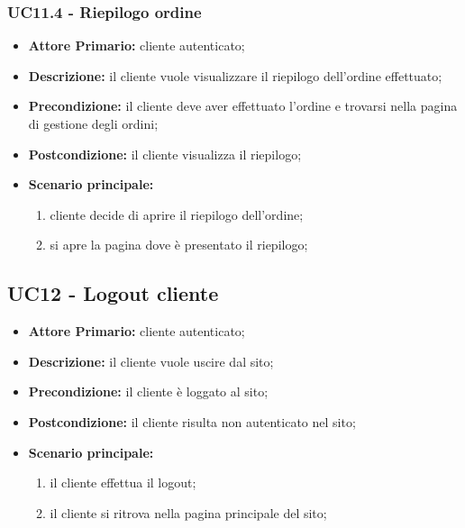 \subsubsection{UC11.4 - Riepilogo ordine}
\label{UC11.4}
\begin{itemize}
\item \textbf{Attore Primario:} cliente autenticato;
\item \textbf{Descrizione:} il cliente vuole visualizzare il riepilogo dell'ordine effettuato;
\item \textbf{Precondizione:} il cliente deve aver effettuato l'ordine e trovarsi nella pagina di gestione degli ordini;
\item \textbf{Postcondizione:} il cliente visualizza il riepilogo;
\item \textbf{Scenario principale:}
\begin{enumerate}
    \item cliente decide di aprire il riepilogo dell'ordine;
    \item si apre la pagina dove è presentato il riepilogo;
\end{enumerate}
\end{itemize}

\subsection{UC12 - Logout cliente}
\label{UC12}
\begin{itemize}
    \item \textbf{Attore Primario:} cliente autenticato;
    \item \textbf{Descrizione:} il cliente vuole uscire dal sito;
    \item \textbf{Precondizione:} il cliente è loggato al sito;
    \item \textbf{Postcondizione:} il cliente risulta non autenticato nel sito;
    \item \textbf{Scenario principale:}
    \begin{enumerate}
        \item il cliente effettua il logout;
        \item il cliente si ritrova nella pagina principale del sito;
    \end{enumerate}
\end{itemize}

